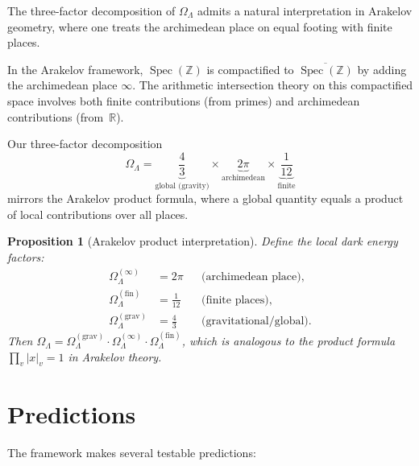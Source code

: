 \documentclass[12pt,a4paper]{article}
\newtheorem{proposition}[theorem]{Proposition}
\theoremstyle{definition}
\newcommand{\Spec}{\operatorname{Spec}}
\newcommand{\Z}{\mathbb{Z}}
\newcommand{\R}{\mathbb{R}}
\newcommand{\OmL}{\Omega_\Lambda}
\begin{document}
The three-factor decomposition of $\OmL$ admits a natural
interpretation in Arakelov geometry, where one treats the
archimedean place on equal footing with finite places.

In the Arakelov framework, $\Spec(\Z)$ is compactified to
$\overline{\Spec(\Z)}$ by adding the archimedean place $\infty$.
The arithmetic intersection theory on this compactified space
involves both finite contributions (from primes) and archimedean
contributions (from~$\R$).

Our three-factor decomposition
\[
  \OmL = \underbrace{\frac{4}{3}}_{\text{global (gravity)}}
       \times\underbrace{2\pi}_{\text{archimedean}}
       \times\underbrace{\frac{1}{12}}_{\text{finite}}
\]
mirrors the Arakelov product formula, where a global quantity
equals a product of local contributions over all places.

\begin{proposition}[Arakelov product interpretation]
Define the local dark energy factors:
\begin{align}
  \OmL^{(\infty)} &= 2\pi & &\text{(archimedean place)}, \\
  \OmL^{(\text{fin})} &= \frac{1}{12} & &\text{(finite places)}, \\
  \OmL^{(\text{grav})} &= \frac{4}{3} & &\text{(gravitational/global)}.
\end{align}
Then $\OmL = \OmL^{(\text{grav})}\cdot\OmL^{(\infty)}\cdot\OmL^{(\text{fin})}$,
which is analogous to the product formula
$\prod_v |x|_v = 1$ in Arakelov theory.
\end{proposition}

\section{Predictions}\label{sec:predictions}

The framework makes several testable predictions:
\end{document}
